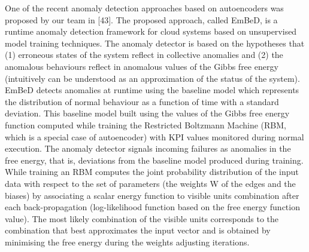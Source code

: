 \documentclass[]{usiinfprospectus}
\begin{document}
%
One of the recent anomaly detection approaches based on autoencoders was proposed by our team in [43]. The proposed approach, called EmBeD, is a runtime anomaly detection framework for cloud systems based on unsupervised model training techniques. The anomaly detector is based on the hypotheses that (1) erroneous states of the system reflect in collective anomalies and (2) the anomalous behaviours reflect in anomalous values of the Gibbs free energy (intuitively can be understood as an approximation of the status of the system). EmBeD detects anomalies at runtime using the baseline model which represents the distribution of normal behaviour as a function of time with a standard deviation. This baseline model built using the values of the Gibbs free energy function computed while training the Restricted Boltzmann Machine (RBM, which is a special case of autoencoder) with KPI values monitored during normal execution. The anomaly detector signals incoming failures as anomalies in the free energy, that is, deviations from the baseline model produced during training. While training an RBM computes the joint probability distribution of the input data with respect to the set of parameters (the weights W of the edges and the biases) by associating a scalar energy function to visible units combination after each back-propagation (log-likelihood function based on the free energy function value). The most likely combination of the visible units corresponds to the combination that best approximates the input vector and is obtained by minimising the free energy during the weights adjusting iterations.\\\\
\end{document}
